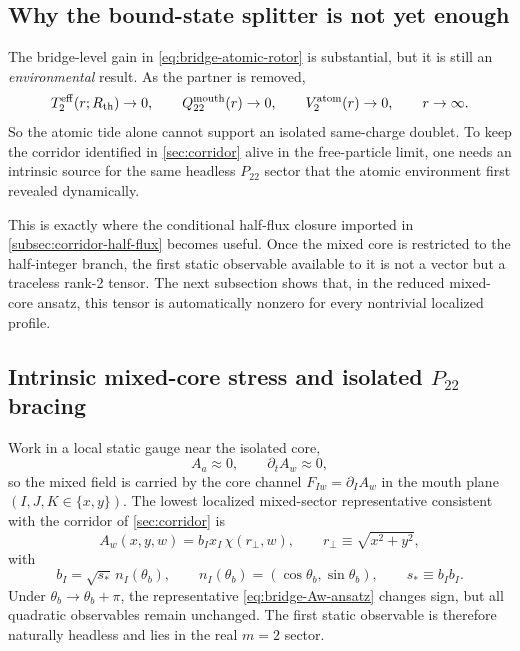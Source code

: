 \documentclass[11pt]{article}
\theoremstyle{plain}
\theoremstyle{definition}
\theoremstyle{remark}
\newcommand{\Ptwotwo}{P_{22}}
\newcommand{\Rth}{R_{\mathrm{th}}}
\begin{document}
\subsection{Why the bound-state splitter is not yet enough}\label{subsec:bridge-not-enough}

The bridge-level gain in \cref{eq:bridge-atomic-rotor} is substantial, but it is still an \emph{environmental} result. As the partner is removed,
\begin{equation}
T_2^{\rm eff}(r;\Rth)\to 0,
\qquad
Q_{22}^{\rm mouth}(r)\to 0,
\qquad
V_2^{\rm atom}(r)\to 0,
\qquad
r\to\infty.
\label{eq:bridge-isolated-limit-vanishing}
\end{equation}
So the atomic tide alone cannot support an isolated same-charge doublet. To keep the corridor identified in \cref{sec:corridor} alive in the free-particle limit, one needs an intrinsic source for the same headless \(\Ptwotwo\) sector that the atomic environment first revealed dynamically.

This is exactly where the conditional half-flux closure imported in \cref{subsec:corridor-half-flux} becomes useful. Once the mixed core is restricted to the half-integer branch, the first static observable available to it is not a vector but a traceless rank-2 tensor. The next subsection shows that, in the reduced mixed-core ansatz, this tensor is automatically nonzero for every nontrivial localized profile.

\subsection{Intrinsic mixed-core stress and isolated \texorpdfstring{$\Ptwotwo$}{P22} bracing}\label{subsec:bridge-intrinsic-bracing}

Work in a local static gauge near the isolated core,
\begin{equation}
A_a\approx 0,
\qquad
\partial_t A_w\approx 0,
\label{eq:bridge-static-gauge}
\end{equation}
so the mixed field is carried by the core channel \(F_{Iw}=\partial_I A_w\) in the mouth plane \((I,J,K\in\{x,y\})\). The lowest localized mixed-sector representative consistent with the corridor of \cref{sec:corridor} is
\begin{equation}
A_w(x,y,w)
=
b_I x_I\,\chi(r_\perp,w),
\qquad
r_\perp\equiv \sqrt{x^2+y^2},
\label{eq:bridge-Aw-ansatz}
\end{equation}
with
\begin{equation}
b_I=\sqrt{s_*}\,n_I(\theta_b),
\qquad
n_I(\theta_b)=(\cos\theta_b,\sin\theta_b),
\qquad
s_*\equiv b_I b_I.
\label{eq:bridge-bI-def}
\end{equation}
Under \(\theta_b\to\theta_b+\pi\), the representative \cref{eq:bridge-Aw-ansatz} changes sign, but all quadratic observables remain unchanged. The first static observable is therefore naturally headless and lies in the real \(m=2\) sector.
\end{document}
